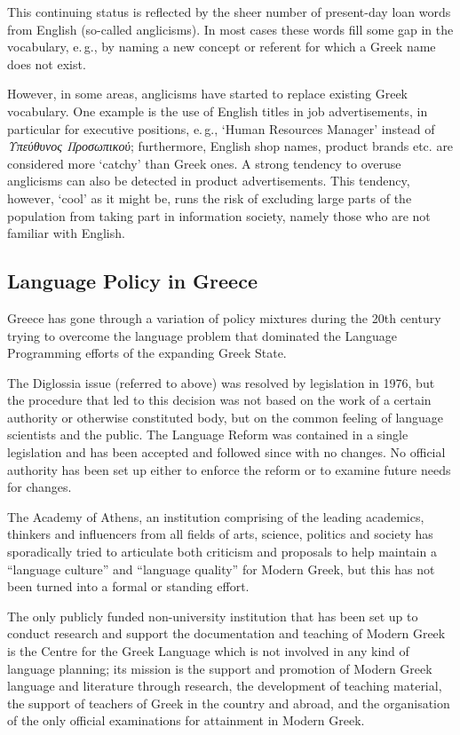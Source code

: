 \begin{multicols}{2}
This continuing status is reflected by the sheer number of present-day loan words from English (so-called anglicisms). In most cases these words fill some gap in the vocabulary, e.\,g., by naming a new concept or referent for which a Greek name does not exist.

However, in some areas, anglicisms have started to replace existing Greek vocabulary. One example is the use of English titles in job advertisements, in particular for executive positions, e.\,g., ‘Human Resources Manager’ instead of \textit{Υπεύθυνος Προσωπικού}; furthermore, English shop names, product brands etc. are considered more ‘catchy’ than Greek ones. A strong tendency to overuse anglicisms can also be detected in product advertisements. This tendency, however, ‘cool’ as it might be, runs the risk of excluding large parts of the population from taking part in information society, namely those who are not familiar with English.

\subsection{Language Policy in Greece}

Greece has gone through a variation of policy mixtures during the 20th century trying to overcome the language problem that dominated the Language Programming efforts of the expanding Greek State.

The Diglossia issue (referred to above) was resolved by legislation in 1976, but the procedure that led to this decision was not based on the work of a certain authority or otherwise constituted body, but on the common feeling of language scientists and the public. The Language Reform was contained in a single legislation and has been accepted and followed since with no changes. No official authority has been set up either to enforce the reform or to examine future needs for changes.

The Academy of Athens, an institution comprising of the leading academics, thinkers and influencers from all fields of arts, science, politics and society has sporadically tried to articulate both criticism and proposals to help maintain a “language culture” and “language quality” for Modern Greek, but this has not been turned into a formal or standing effort.

The only publicly funded non-university institution that has been set up to conduct research and support the documentation and teaching of Modern Greek is the Centre for the Greek Language which is not involved in any kind of language planning; its mission is the support and promotion of Modern Greek language and literature through research, the development of teaching material, the support of teachers of Greek in the country and abroad, and the organisation of the only official examinations for attainment in Modern Greek.


\end{multicols}
